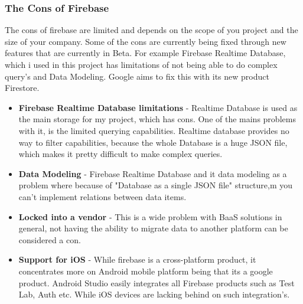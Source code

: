 \newpage
\subsubsection{The Cons of Firebase}
The cons of firebase are limited and depends on the scope of you project and the size of your company. Some of the cons are currently being fixed through new features that are currently in Beta. For example Firebase Realtime Database, which i used in this project has limitations of not being able to do complex query's and Data Modeling. Google aims to fix this with its new product Firestore. 
\begin{itemize}
    \item \textbf{Firebase Realtime Database limitations} - Realtime Database is used as the main storage for my project, which has cons. One of the mains problems with it, is the limited querying capabilities. Realtime database provides no way to filter capabilities, because the whole Database is a huge JSON file, which makes it pretty difficult to make complex queries.
    \item \textbf{Data Modeling} - Firebase Realtime Database and it data modeling as a problem where because of "Database as a single JSON file" structure,m you can't implement relations between data items.
    \item \textbf{Locked into a vendor} - This is a wide problem with BaaS solutions in general, not having the ability to migrate data to another platform can be considered a con.
     \item \textbf{Support for iOS} - While firebase is a cross-platform product, it concentrates more on Android mobile platform being that its a google product. Android Studio easily integrates all Firebase products such as Test Lab, Auth etc. While iOS devices are lacking behind on such integration's.
\end{itemize}
\newpage

